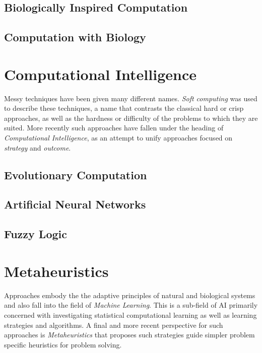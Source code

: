 \documentclass[a4paper, 11pt]{article}
\begin{document}
\subsection{Biologically Inspired Computation}

\subsection{Computation with Biology}


% 
% 
\section{Computational Intelligence}
\label{sec:computationl_intelligence}
Messy techniques have been given many different names. \emph{Soft computing} was used to describe these techniques, a name that contrasts the classical hard or crisp approaches, as well as the hardness or difficulty of the problems to which they are suited. More recently such approaches have fallen under the heading of \emph{Computational Intelligence}, as an attempt to unify approaches focused on \emph{strategy} and \emph{outcome}.

\subsection{Evolutionary Computation}

\subsection{Artificial Neural Networks}

\subsection{Fuzzy Logic}

% 
% 
\section{Metaheuristics}
\label{sec:metaheuristics}
Approaches embody the the adaptive principles of natural and biological systems and also fall into the field of \emph{Machine Learning}. This is a sub-field of AI primarily concerned with investigating statistical computational learning as well as learning strategies and algorithms. A final and more recent perspective for such approaches is \emph{Metaheuristics} that proposes such strategies guide simpler problem specific heuristics for problem solving.
\end{document}
